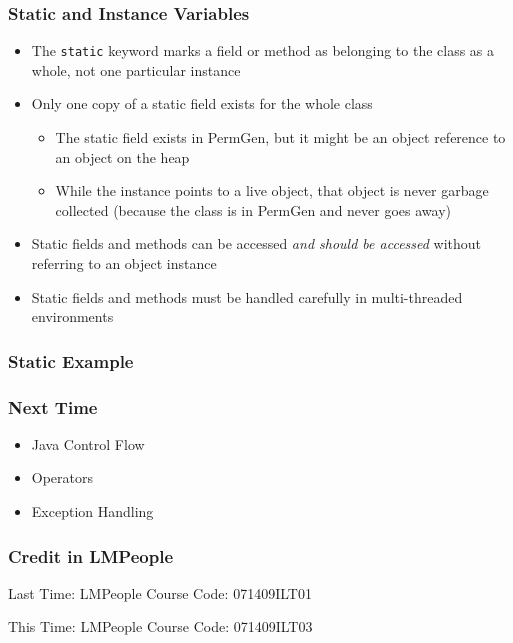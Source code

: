 \documentclass{beamer}
\begin{document}
\begin{frame}
\frametitle{Static and Instance Variables}
\begin{itemize}
\item The \texttt{static} keyword marks a field or method as belonging to the class as a whole, not one particular instance
\item Only one copy of a static field exists for the whole class
\begin{itemize}
\item The static field exists in PermGen, but it might be an object reference to an object on the heap
\item While the instance points to a live object, that object is never garbage collected (because the class is in PermGen and never goes away)
\end{itemize}
\item Static fields and methods can be accessed \emph{and should be accessed} without referring to an object instance
\item Static fields and methods must be handled carefully in multi-threaded environments
\end{itemize}
\end{frame}

\begin{frame}[fragile]
\frametitle{Static Example}

\end{frame}

\begin{frame}
\frametitle{Next Time}
\begin{itemize}
\item Java Control Flow
\item Operators
\item Exception Handling
\end{itemize}
\end{frame}


\begin{frame}
\frametitle{Credit in LMPeople}
\begin{center}
Last Time: LMPeople Course Code: 071409ILT01

This Time: LMPeople Course Code: 071409ILT03
\end{center}
\end{frame}
\end{document}

